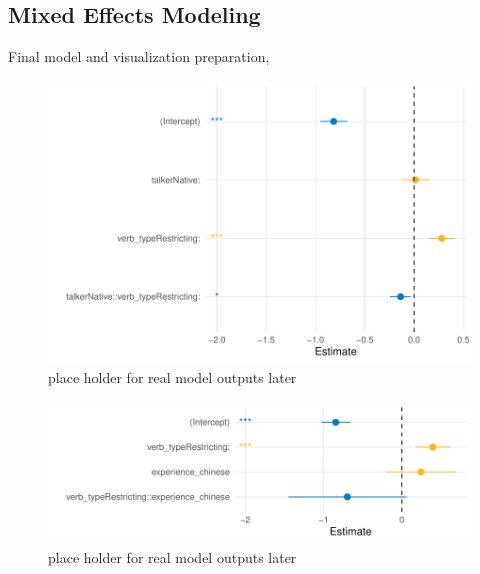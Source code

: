 \subsection{Mixed Effects Modeling}
Final model and visualization preparation, 









\begin{figure}[h]
    \centering
    \includegraphics[width=\textwidth]{figures/GLMER_base_model.pdf}
    \caption{place holder for real model outputs later}
    \label{fig:model_outputs}
\end{figure}

\begin{figure}[h]
    \centering
    \includegraphics[width=\textwidth]{figures/GLMER_accent_model.pdf}
    \caption{place holder for real model outputs later}
    \label{fig:model_outputs}
\end{figure}

